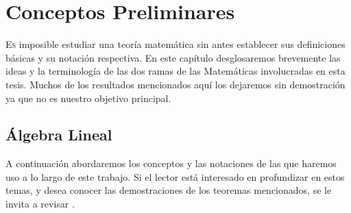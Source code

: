 \chapter{Conceptos Preliminares}


    \lettrine[lines=5] { \initfamily \selectfont E}{s} imposible estudiar una teoría matemática sin antes establecer sus definiciones básicas y su notación respectiva. En este capítulo desglosaremos brevemente las ideas y la terminología de las dos ramas de las Matemáticas involucradas en esta tesis. Muchos de los resultados mencionados aquí los dejaremos sin demostración ya que no es nuestro objetivo principal.
    
 

    \section{Álgebra Lineal}
        A continuación abordaremos los conceptos y las notaciones de las que haremos uso a lo largo de este trabajo. Si el lector está interesado en profundizar en estos temas, y desea conocer las demostraciones de los teoremas mencionados, se le invita a revisar \cite{Friedberg,Noble,Zhang, Shores}.

